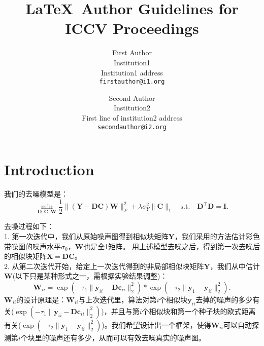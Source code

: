 \documentclass[10pt,twocolumn,letterpaper]{article}
\begin{document}
\title{\LaTeX\ Author Guidelines for ICCV Proceedings}

\author{First Author\\
Institution1\\
Institution1 address\\
{\tt\small firstauthor@i1.org}
\and
Second Author\\
Institution2\\
First line of institution2 address\\
{\tt\small secondauthor@i2.org}
}

\maketitle


\section{Introduction}

我们的去噪模型是：
\begin{equation}
\min_{\mathbf{D},\mathbf{C},\mathbf{W}}\frac{1}{2}\|(\mathbf{Y}-\mathbf{D}\mathbf{C})\mathbf{W}\|_{F}^{2}
+
\lambda\sigma_{Y}^{2}\|\mathbf{C}\|_{1}
\quad
\text{s.t.}
\quad
\mathbf{D}^{\top}\mathbf{D} =\mathbf{I}. 
\end{equation}

去噪过程如下：
\\
1. 第一次迭代中，我们从原始噪声图得到相似块矩阵$\mathbf{Y}$，我们采用\cite{Chen2015ICCV}的方法估计彩色带噪图的噪声水平$\sigma_{0}$，$\mathbf{W}$也是全1矩阵。
用上述模型去噪之后，得到第一次去噪后的相似块矩阵$\mathbf{X}=\mathbf{DC}$。
\\
2. 从第二次迭代开始，给定上一次迭代得到的非局部相似块矩阵$\mathbf{Y}$，我们从中估计$\mathbf{W}$(以下只是某种形式之一，需根据实验结果调整)：
\begin{equation}
\mathbf{W}_{ii} 
=
\exp(-\tau_{1}\|\mathbf{y}_{ii}-\mathbf{D}\mathbf{c}_{ii}\|_{2}^{2})
*\exp(-\tau_{2}\|\mathbf{y}_{1}-\mathbf{y}_{ii}\|_{2}^{2}).
\end{equation}
$\mathbf{W}_{ii}$的设计原理是：$\mathbf{W}_{ii}$与上次迭代里，算法对第$i$个相似块$\mathbf{y}_{ii}$去掉的噪声的多少有关($\exp(-\tau_{1}\|\mathbf{y}_{ii}-\mathbf{D}\mathbf{c}_{ii}\|_{2}^{2})$)，并且与第$i$个相似块和第一个种子块的欧式距离有关($\exp(-\tau_{2}\|\mathbf{y}_{1}-\mathbf{y}_{ii}\|_{2}^{2})$)。我们希望设计出一个框架，使得$\mathbf{W}_{ii}$可以自动探测第$i$个块里的噪声还有多少，从而可以有效去噪真实的噪声图。
\end{document}
